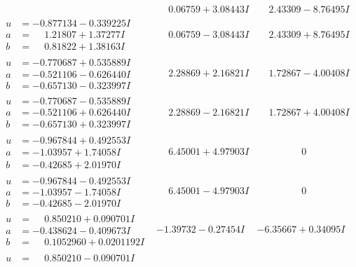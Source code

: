 \documentclass[1p]{elsarticle_modified}
\theoremstyle{definition}
\begin{document}
$$\begin{array}{c|c|c}
 & \phantom{-}0.06759 + 3.08443 I & \phantom{-}2.43309 - 8.76495 I \\ \hline\begin{aligned}
u &= -0.877134 - 0.339225 I \\
a &= \phantom{-}1.21807 + 1.37277 I \\
b &= \phantom{-}0.81822 + 1.38163 I\end{aligned}
 & \phantom{-}0.06759 - 3.08443 I & \phantom{-}2.43309 + 8.76495 I \\ \hline\begin{aligned}
u &= -0.770687 + 0.535889 I \\
a &= -0.521106 - 0.626440 I \\
b &= -0.657130 - 0.323997 I\end{aligned}
 & \phantom{-}2.28869 + 2.16821 I & \phantom{-}1.72867 - 4.00408 I \\ \hline\begin{aligned}
u &= -0.770687 - 0.535889 I \\
a &= -0.521106 + 0.626440 I \\
b &= -0.657130 + 0.323997 I\end{aligned}
 & \phantom{-}2.28869 - 2.16821 I & \phantom{-}1.72867 + 4.00408 I \\ \hline\begin{aligned}
u &= -0.967844 + 0.492553 I \\
a &= -1.03957 + 1.74058 I \\
b &= -0.42685 + 2.01970 I\end{aligned}
 & \phantom{-}6.45001 + 4.97903 I & \phantom{-0.000000 } 0 \\ \hline\begin{aligned}
u &= -0.967844 - 0.492553 I \\
a &= -1.03957 - 1.74058 I \\
b &= -0.42685 - 2.01970 I\end{aligned}
 & \phantom{-}6.45001 - 4.97903 I & \phantom{-0.000000 } 0 \\ \hline\begin{aligned}
u &= \phantom{-}0.850210 + 0.090701 I \\
a &= -0.438624 - 0.409673 I \\
b &= \phantom{-}0.1052960 + 0.0201192 I\end{aligned}
 & -1.39732 - 0.27454 I & -6.35667 + 0.34095 I \\ \hline\begin{aligned}
u &= \phantom{-}0.850210 - 0.090701 I \\

\end{aligned}
\end{array}$$
\end{document}

